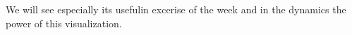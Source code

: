 We will see especially its usefulin excerise of the week and in the dynamics the power of this visualization.